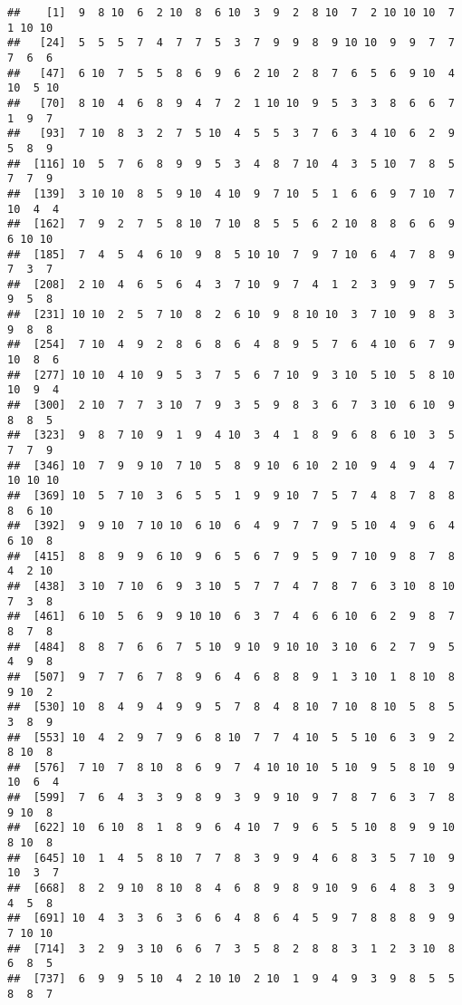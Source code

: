 \documentclass[]{article}
\begin{document}
\begin{verbatim}
##    [1]  9  8 10  6  2 10  8  6 10  3  9  2  8 10  7  2 10 10 10  7  1 10 10
##   [24]  5  5  5  7  4  7  7  5  3  7  9  9  8  9 10 10  9  9  7  7  7  6  6
##   [47]  6 10  7  5  5  8  6  9  6  2 10  2  8  7  6  5  6  9 10  4 10  5 10
##   [70]  8 10  4  6  8  9  4  7  2  1 10 10  9  5  3  3  8  6  6  7  1  9  7
##   [93]  7 10  8  3  2  7  5 10  4  5  5  3  7  6  3  4 10  6  2  9  5  8  9
##  [116] 10  5  7  6  8  9  9  5  3  4  8  7 10  4  3  5 10  7  8  5  7  7  9
##  [139]  3 10 10  8  5  9 10  4 10  9  7 10  5  1  6  6  9  7 10  7 10  4  4
##  [162]  7  9  2  7  5  8 10  7 10  8  5  5  6  2 10  8  8  6  6  9  6 10 10
##  [185]  7  4  5  4  6 10  9  8  5 10 10  7  9  7 10  6  4  7  8  9  7  3  7
##  [208]  2 10  4  6  5  6  4  3  7 10  9  7  4  1  2  3  9  9  7  5  9  5  8
##  [231] 10 10  2  5  7 10  8  2  6 10  9  8 10 10  3  7 10  9  8  3  9  8  8
##  [254]  7 10  4  9  2  8  6  8  6  4  8  9  5  7  6  4 10  6  7  9 10  8  6
##  [277] 10 10  4 10  9  5  3  7  5  6  7 10  9  3 10  5 10  5  8 10 10  9  4
##  [300]  2 10  7  7  3 10  7  9  3  5  9  8  3  6  7  3 10  6 10  9  8  8  5
##  [323]  9  8  7 10  9  1  9  4 10  3  4  1  8  9  6  8  6 10  3  5  7  7  9
##  [346] 10  7  9  9 10  7 10  5  8  9 10  6 10  2 10  9  4  9  4  7 10 10 10
##  [369] 10  5  7 10  3  6  5  5  1  9  9 10  7  5  7  4  8  7  8  8  8  6 10
##  [392]  9  9 10  7 10 10  6 10  6  4  9  7  7  9  5 10  4  9  6  4  6 10  8
##  [415]  8  8  9  9  6 10  9  6  5  6  7  9  5  9  7 10  9  8  7  8  4  2 10
##  [438]  3 10  7 10  6  9  3 10  5  7  7  4  7  8  7  6  3 10  8 10  7  3  8
##  [461]  6 10  5  6  9  9 10 10  6  3  7  4  6  6 10  6  2  9  8  7  8  7  8
##  [484]  8  8  7  6  6  7  5 10  9 10  9 10 10  3 10  6  2  7  9  5  4  9  8
##  [507]  9  7  7  6  7  8  9  6  4  6  8  8  9  1  3 10  1  8 10  8  9 10  2
##  [530] 10  8  4  9  4  9  9  5  7  8  4  8 10  7 10  8 10  5  8  5  3  8  9
##  [553] 10  4  2  9  7  9  6  8 10  7  7  4 10  5  5 10  6  3  9  2  8 10  8
##  [576]  7 10  7  8 10  8  6  9  7  4 10 10 10  5 10  9  5  8 10  9 10  6  4
##  [599]  7  6  4  3  3  9  8  9  3  9  9 10  9  7  8  7  6  3  7  8  9 10  8
##  [622] 10  6 10  8  1  8  9  6  4 10  7  9  6  5  5 10  8  9  9 10  8 10  8
##  [645] 10  1  4  5  8 10  7  7  8  3  9  9  4  6  8  3  5  7 10  9 10  3  7
##  [668]  8  2  9 10  8 10  8  4  6  8  9  8  9 10  9  6  4  8  3  9  4  5  8
##  [691] 10  4  3  3  6  3  6  6  4  8  6  4  5  9  7  8  8  8  9  9  7 10 10
##  [714]  3  2  9  3 10  6  6  7  3  5  8  2  8  8  3  1  2  3 10  8  6  8  5
##  [737]  6  9  9  5 10  4  2 10 10  2 10  1  9  4  9  3  9  8  5  5  8  8  7

\end{verbatim}
\end{document}
